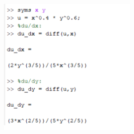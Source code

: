 \documentclass[a4paper]{article}
\begin{document}
	\begin{figure}[H]
		\centering
		\includegraphics[width=0.6\textwidth]{PDE1.png}
	\end{figure}
	
\end{document}
